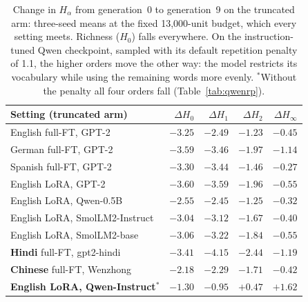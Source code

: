 \documentclass[10pt]{article}
\theoremstyle{plain}
\theoremstyle{definition}
\newcommand{\Htwo}{H_2}
\newcommand{\Hz}{H_0}
\newcommand{\Hinf}{H_\infty}
\begin{document}
\begin{table}[ht]
\centering\small
\caption{Change in $H_\alpha$ from generation~0 to generation~9 on the truncated arm: three-seed
means at the fixed 13,000-unit budget, which every setting meets. Richness ($\Hz$) falls everywhere.
On the instruction-tuned Qwen checkpoint, sampled with its default repetition penalty of 1.1,
the higher orders move the other way: the model restricts its vocabulary while using the
remaining words more evenly. $^\ast$Without the penalty all four orders fall
(Table~\ref{tab:qwenrp}).}
\label{tab:dissociate}
\begin{tabular}{lrrrr}
\toprule
Setting (truncated arm) & $\Delta\Hz$ & $\Delta H_1$ & $\Delta\Htwo$ & $\Delta\Hinf$ \\
\midrule
English full-FT, GPT-2 & $-3.25$ & $-2.49$ & $-1.23$ & $-0.45$ \\
German full-FT, GPT-2 & $-3.59$ & $-3.46$ & $-1.97$ & $-1.14$ \\
Spanish full-FT, GPT-2 & $-3.30$ & $-3.44$ & $-1.46$ & $-0.27$ \\
English LoRA, GPT-2 & $-3.60$ & $-3.59$ & $-1.96$ & $-0.55$ \\
English LoRA, Qwen-0.5B & $-2.55$ & $-2.45$ & $-1.25$ & $-0.32$ \\
English LoRA, SmolLM2-Instruct & $-3.04$ & $-3.12$ & $-1.67$ & $-0.40$ \\
English LoRA, SmolLM2-base & $-3.06$ & $-3.22$ & $-1.84$ & $-0.55$ \\
\textbf{Hindi} full-FT, gpt2-hindi & $-3.41$ & $-4.15$ & $-2.44$ & $-1.19$ \\
\textbf{Chinese} full-FT, Wenzhong & $-2.18$ & $-2.29$ & $-1.71$ & $-0.42$ \\
\textbf{English LoRA, Qwen-Instruct}$^\ast$ & $\mathbf{-1.30}$ & $\mathbf{-0.95}$ & $\mathbf{+0.47}$ & $\mathbf{+1.62}$ \\
\bottomrule
\end{tabular}
\end{table}
\end{document}
